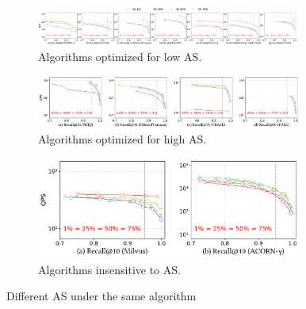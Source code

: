 \documentclass[sigconf, nonacm]{acmart}
\begin{document}
	
	
	
	\begin{figure}
		\centering
		
		\begin{subfigure}{\textwidth}
			\centering
			
			\includegraphics[width=0.95\textwidth]{figures/exp/exp_5_2_1.pdf}
			\caption{Algorithms optimized for low AS.}
			\label{fig:exp_5_2_1}
		\end{subfigure}
		
		\vfill %
		
		\begin{subfigure}{0.627\textwidth} %
			\centering
			
			\includegraphics[width=0.96\textwidth]{figures/exp/exp_5_2_2.pdf}
			\caption{Algorithms optimized for high AS.}
			\label{fig:exp_5_2_2}
		\end{subfigure}
		\hspace{1mm} %
		\begin{subfigure}{0.33\textwidth} %
			\centering
			
			\includegraphics[width=0.96\textwidth]{figures/exp/exp_5_2_3.pdf}
			\caption{Algorithms insensitive to AS.}
			\label{fig:exp_5_2_3}
		\end{subfigure}
		
		
		\caption{Different AS under the same algorithm}
		\label{fig:exp_5_2_combined}
	\end{figure}
	
\end{document}
